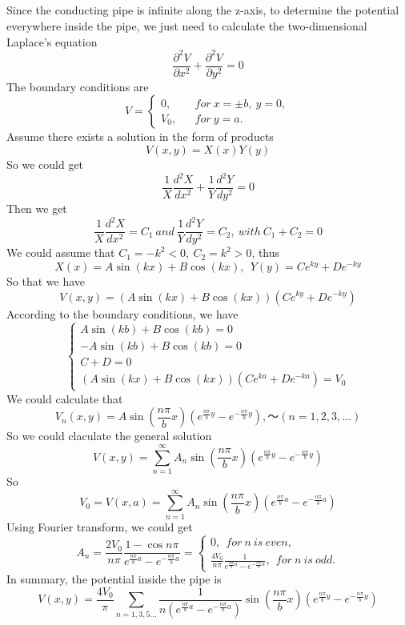 \documentclass[10.5pt]{article}
\begin{document}
\subsection{}
Since the conducting pipe is infinite along the z-axis, to determine the potential everywhere inside the pipe, we just need to calculate the two-dimensional Laplace's equation$$\frac{\partial ^2V}{\partial x^2} + \frac{\partial ^2V}{\partial y^2} = 0$$\indent
The boundary conditions are$$ V=\left\{
\begin{array}{rcl}
    0, & & for~x=\pm b,~y=0,\\
    V_0, & & for~y=a.
\end{array}\right.$$\indent
Assume there exists a solution in the form of products$$V(x,y) = X(x)Y(y)$$\indent
So we could get$$\frac{1}{X}\frac{d^2 X}{dx^2} + \frac{1}{Y}\frac{d^2 Y}{dy^2} = 0$$\indent
Then we get$$\frac{1}{X}\frac{d^2 X}{dx^2} = C_1 ~and~ \frac{1}{Y}\frac{d^2 Y}{dy^2} = C_2, ~with~C_1+C_2=0$$\indent
We could assume that $C_1 = -k^2 < 0,~C_2 = k^2 > 0$, thus$$X(x) = A\sin(kx) + B\cos(kx),~~Y(y) = Ce^{ky} + De^{-ky}$$\indent
So that we have$$V(x,y) = \left(A\sin(kx) + B\cos(kx)\right)\left(Ce^{ky} + De^{-ky}\right)$$\indent
According to the boundary conditions, we have
\begin{equation}
    \begin{cases}
        A\sin(kb) + B\cos(kb) = 0\\
        -A\sin(kb) + B\cos(kb) = 0\\
        C + D = 0\\
        \left(A\sin(kx) + B\cos(kx)\right)\left(Ce^{ka} + De^{-ka}\right) = V_0
    \end{cases}
\end{equation}\indent
We could calculate that \large$$V_n(x,y) = A\sin\left(\frac{n\pi}{b}x\right)\left(e^{\frac{n\pi}{b}y}-e^{-\frac{n\pi}{b}y}\right),～(n = 1,2,3,\dots)$$\indent\normalsize
So we could claculate the general solution\large$$V(x,y) = \sum_{n = 1}^{\infty} A_n \sin\left(\frac{n\pi}{b}x\right)\left(e^{\frac{n\pi}{b}y}-e^{-\frac{n\pi}{b}y}\right) $$\indent\normalsize
So $$V_0 = V(x,a) = \sum_{n = 1}^{\infty} A_n \sin\left(\frac{n\pi}{b}x\right) \left(e^{\frac{n\pi}{b}a}-e^{-\frac{n\pi}{b}a}\right)$$\indent\normalsize
Using Fourier transform, we could get \LARGE$$A_n = \frac{2V_0}{n\pi}\frac{1-\cos n\pi}{e^{\frac{n\pi}{b}a}-e^{-\frac{n\pi}{b}a}} = \begin{cases}
    0, ~~for ~n ~is ~even,\\
    \frac{4V_0}{n\pi}\frac{1}{e^{\frac{n\pi}{b}a}-e^{-\frac{n\pi}{b}a}}, ~~for ~n ~is ~odd.
\end{cases}$$\indent\normalsize
In summary, the potential inside the pipe is \LARGE$$V(x,y) = \frac{4V_0}{\pi } \sum _{n=1,3,5\dots} \frac{1}{n\left(e^{\frac{n\pi}{b}a}-e^{-\frac{n\pi}{b}a}\right)}\sin\left(\frac{n\pi}{b}x\right)\left(e^{\frac{n\pi}{b}y}-e^{-\frac{n\pi}{b}y}\right)$$
\end{document}
